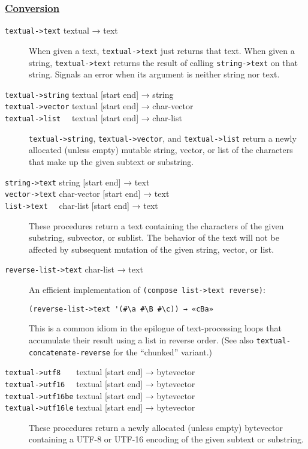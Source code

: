 \subsubsection{\texorpdfstring{\href{}{Conversion}}{Conversion}}\label{conversion}

\begin{description}
\item[ \href{}{} \texttt{textual-\textgreater{}text} textual → text ]
When given a text, \texttt{textual-\textgreater{}text} just returns that
text. When given a string, \texttt{textual-\textgreater{}text} returns
the result of calling \texttt{string-\textgreater{}text} on that string.
Signals an error when its argument is neither string nor text.
\item[ \href{}{} \href{}{} \href{}{}
\texttt{textual-\textgreater{}string} textual {[}start end{]} → string\\
\texttt{textual-\textgreater{}vector} textual {[}start end{]} →
char-vector\\
\texttt{textual-\textgreater{}list~~} textual {[}start end{]} →
char-list ]
\texttt{textual-\textgreater{}string},
\texttt{textual-\textgreater{}vector}, and
\texttt{textual-\textgreater{}list} return a newly allocated (unless
empty) mutable string, vector, or list of the characters that make up
the given subtext or substring.
\item[ \href{}{} \href{}{} \href{}{} \texttt{string-\textgreater{}text}
string {[}start end{]} → text\\
\texttt{vector-\textgreater{}text} char-vector {[}start end{]} → text\\
\texttt{list-\textgreater{}text~~} char-list {[}start end{]} → text ]
These procedures return a text containing the characters of the given
substring, subvector, or sublist. The behavior of the text will not be
affected by subsequent mutation of the given string, vector, or list.
\item[ \href{}{} \texttt{reverse-list-\textgreater{}text} char-list →
text ]
An efficient implementation of
\texttt{(compose\ list-\textgreater{}text\ reverse)}:

\begin{verbatim}
(reverse-list->text '(#\a #\B #\c)) → «cBa»
\end{verbatim}

This is a common idiom in the epilogue of text-processing loops that
accumulate their result using a list in reverse order. (See also
\texttt{textual-concatenate-reverse} for the ``chunked'' variant.)
\item[ \href{}{} \href{}{} \href{}{} \href{}{}
\texttt{textual-\textgreater{}utf8~~~} textual {[}start end{]} →
bytevector\\
\texttt{textual-\textgreater{}utf16~~} textual {[}start end{]} →
bytevector\\
\texttt{textual-\textgreater{}utf16be} textual {[}start end{]} →
bytevector\\
\texttt{textual-\textgreater{}utf16le} textual {[}start end{]} →
bytevector ]
These procedures return a newly allocated (unless empty) bytevector
containing a UTF-8 or UTF-16 encoding of the given subtext or substring.


\end{description}
